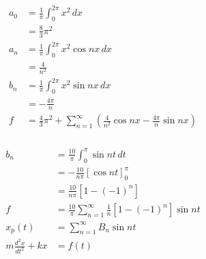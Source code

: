 \documentclass{article}
\begin{document}
\setcounter{subsubsection}{34}
\subsubsection{}

\begin{align*}
  a_0 & = \frac{1}{\pi} \int_0^{2 \pi} x^2 \,d x                                                                   \\
      & = \frac{8}{3} \pi^2                                                                                        \\
  a_n & = \frac{1}{\pi} \int_0^{2 \pi} x^2 \cos n x \,d x                                                          \\
      & = \frac{4}{n^2}                                                                                            \\
  b_n & = \frac{1}{\pi} \int_0^{2 \pi} x^2 \sin n x \,d x                                                          \\
      & = -\frac{4 \pi}{n}                                                                                         \\
  f   & = \frac{4}{3} \pi^2 + \sum_{n = 1}^\infty \left( \frac{4}{n^2} \cos n x - \frac{4 \pi}{n} \sin n x \right)
\end{align*}

\setcounter{subsubsection}{42}
\subsubsection{}

\begin{align*}
  b_n                         & = \frac{10}{\pi} \int_0^\pi \sin n t \,d t                             \\
                              & = -\frac{10}{n \pi} [\cos n t]_0^\pi                                   \\
                              & = \frac{10}{n \pi} [1 - (-1)^n]                                        \\
  f                           & = \frac{10}{\pi} \sum_{n = 1}^\infty \frac{1}{n} [1 - (-1)^n] \sin n t \\
  x_p(t)                      & = \sum_{n = 1}^\infty B_n \sin n t                                     \\
  m \frac{d^2 x}{d t^2} + k x & = f(t)
\end{align*}
\end{document}
